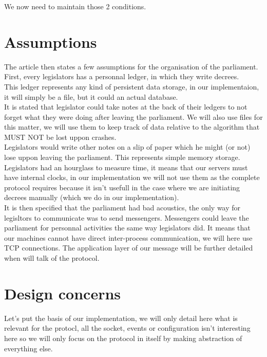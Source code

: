 \documentclass{article}
\begin{document}
We now need to maintain those 2 conditions.

\section{Assumptions}
The article then states a few assumptions for the organisation of the parliament.\\
First, every legislators has a personnal ledger, in which they write decrees.\\
This ledger represents any kind of persistent data storage, in our implementaion, it will simply be a file, but it could an actual database.\\
It is stated that legislator could take notes at the back of their ledgers to not forget what they were doing after leaving the parliament. We will also use files for this matter, we will use them to keep track of data relative to the algorithm that MUST NOT be lost uppon crashes.\\
Legislators would write other notes on a slip of paper which he might (or not) lose uppon leaving the parliament. This represents simple memory storage.\\
Legislators had an hourglass to measure time, it means that our servers must have internal clocks, in our implementation we will not use them as the complete protocol requires because it isn't usefull in the case where we are initiating decrees manually (which we do in our implementation).\\

It is then specified that the parliament had bad acoustics, the only way for legisltors to communicate was to send messengers. Messengers could leave the parliament for personnal activities the same way legislators did. It means that our machines cannot have direct inter-process communication, we will here use TCP connections.
The application layer of our message will be further detailed when will talk of the protocol.

\section{Design concerns}
Let's put the basis of our implementation, we will only detail here what is relevant for the protocl, all the socket, events or configuration isn't interesting here so we will only focus on the protocol in itself by making abstraction of everything else.
\end{document}
